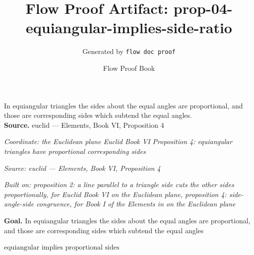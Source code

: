 \documentclass[11pt]{article}
\title{Flow Proof Artifact: prop-04-equiangular-implies-side-ratio}
\author{Generated by \texttt{flow doc proof}}
\date{Flow Proof Book}
\theoremstyle{definition}
\begin{document}
\maketitle
In equiangular triangles the sides about the equal angles are proportional, and those are corresponding sides which subtend the equal angles.\\[0.5em]
\textbf{Source.} euclid — Elements, Book VI, Proposition 4\\[0.5em]
\bigskip
{}\par
\smallskip\noindent\textit{Coordinate: the Euclidean plane \cdot Euclid Book VI \cdot Proposition 4: equiangular triangles have proportional corresponding sides}\par
\smallskip\noindent\textit{Source: euclid — Elements, Book VI, Proposition 4}\par
\smallskip\noindent\textit{Built on: proposition 2: a line parallel to a triangle side cuts the other sides proportionally, for Euclid Book VI on the Euclidean plane, proposition 4: side-angle-side congruence, for Book I of the Elements in on the Euclidean plane}\par
\medskip
\noindent\textbf{Goal.} In equiangular triangles the sides about the equal angles are proportional, and those are corresponding sides which subtend the equal angles\par
\noindent$\displaystyle \text{equiangular implies proportional sides}$\par
\medskip
\noindent
\end{document}
